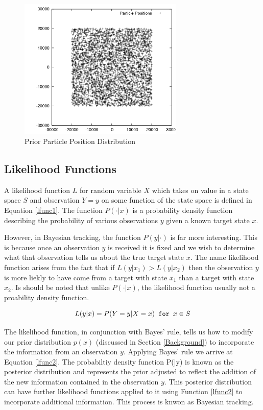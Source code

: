 \documentclass{article}
\begin{document}
\begin{figure}
\centering
\includegraphics[width=0.7\textwidth]{data/particles_prior.png}
\caption{Prior Particle Position Distribution}
\label{prior}
\end{figure}

\subsection{Likelihood Functions}
A likelihood function \(L\) for random variable \(X\) which takes on value in a state space \(S\) and observation \(Y=y\) on some function of the state space is defined in Equation \ref{lfunc1}. The function \(P(\cdot|x)\) is a probability density function describing the probability of various observations \(y\) given a known target state \(x\).

However, in Bayesian tracking, the function \(P(y|\cdot)\) is far more interesting. This is because once an observation \(y\) is received it is fixed and we wish to determine what that observation tells us about the true target state \(x\). The name likelihood function arises from the fact that if \(L(y|x_{1})>L(y|x_{2})\) then the observation \(y\) is more liekly to have come from a target with state \(x_{1}\) than a target with state \(x_{2}\). Is should be noted that unlike \(P(\cdot|x)\), the likelihood function usually not a proability density function\cite{bmtt}.

\begin{equation}\label{lfunc1}
L(y|x) = P( Y=y | X=x ) \verb! for ! x \in S
\end{equation}

The likelihood function, in conjunction with Bayes' rule, tells us how to modify our prior distribution \(p(x)\) (discussed in Section \ref{Background}) to incorporate the information from an observation \(y\). Applying Bayes' rule we arrive at Equation \ref{lfunc2}. The probabiltiy density function P(\cdot|y) is known as the posterior distribution and represents the prior adjusted to reflect the addition of the new information contained in the observation \(y\). This posterior distribution can have further likelihood functions applied to it using Function \ref{lfunc2} to incorporate additional information. This process is knwon as Bayesian tracking.
\end{document}
